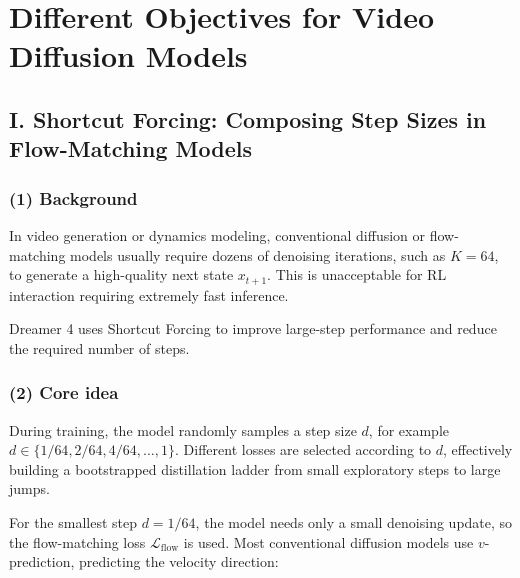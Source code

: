\setcounter{section}{5}

\hypertarget{different-objectives-for-video-diffusion-models}{%
\section{Different Objectives for Video Diffusion Models}\label{different-objectives-for-video-diffusion-models}}

\hypertarget{i.-shortcut-forcing-composing-step-sizes-in-flow-matching-models}{%
\subsection{I. Shortcut Forcing: Composing Step Sizes in Flow-Matching Models}\label{i.-shortcut-forcing-composing-step-sizes-in-flow-matching-models}}

\hypertarget{background-1}{%
\subsubsection{(1) Background}\label{background-1}}

In video generation or dynamics modeling, conventional diffusion or flow-matching models usually require dozens of denoising iterations, such as \(K=64\), to generate a high-quality next state \(x_{t+1}\). This is unacceptable for RL interaction requiring extremely fast inference.

Dreamer 4 uses Shortcut Forcing to improve large-step performance and reduce the required number of steps.

\hypertarget{core-idea-1}{%
\subsubsection{(2) Core idea}\label{core-idea-1}}

During training, the model randomly samples a step size \(d\), for example \(d\in\{1/64,2/64,4/64,\ldots,1\}\). Different losses are selected according to \(d\), effectively building a bootstrapped distillation ladder from small exploratory steps to large jumps.

For the smallest step \(d=1/64\), the model needs only a small denoising update, so the flow-matching loss \(\mathcal{L}_{\mathrm{flow}}\) is used. Most conventional diffusion models use \(v\)-prediction, predicting the velocity direction:


